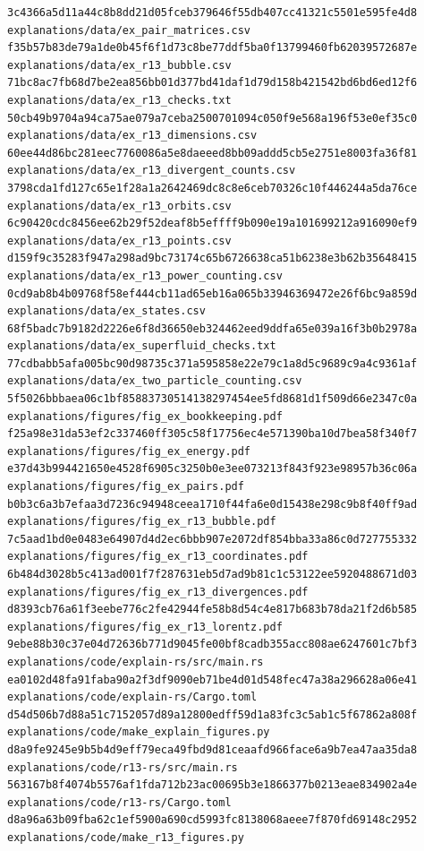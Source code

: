 \documentclass[
  10pt,
]{article}
\begin{document}
\begin{verbatim}
3c4366a5d11a44c8b8dd21d05fceb379646f55db407cc41321c5501e595fe4d8  explanations/data/ex_pair_matrices.csv
f35b57b83de79a1de0b45f6f1d73c8be77ddf5ba0f13799460fb62039572687e  explanations/data/ex_r13_bubble.csv
71bc8ac7fb68d7be2ea856bb01d377bd41daf1d79d158b421542bd6bd6ed12f6  explanations/data/ex_r13_checks.txt
50cb49b9704a94ca75ae079a7ceba2500701094c050f9e568a196f53e0ef35c0  explanations/data/ex_r13_dimensions.csv
60ee44d86bc281eec7760086a5e8daeeed8bb09addd5cb5e2751e8003fa36f81  explanations/data/ex_r13_divergent_counts.csv
3798cda1fd127c65e1f28a1a2642469dc8c8e6ceb70326c10f446244a5da76ce  explanations/data/ex_r13_orbits.csv
6c90420cdc8456ee62b29f52deaf8b5effff9b090e19a101699212a916090ef9  explanations/data/ex_r13_points.csv
d159f9c35283f947a298ad9bc73174c65b6726638ca51b6238e3b62b35648415  explanations/data/ex_r13_power_counting.csv
0cd9ab8b4b09768f58ef444cb11ad65eb16a065b33946369472e26f6bc9a859d  explanations/data/ex_states.csv
68f5badc7b9182d2226e6f8d36650eb324462eed9ddfa65e039a16f3b0b2978a  explanations/data/ex_superfluid_checks.txt
77cdbabb5afa005bc90d98735c371a595858e22e79c1a8d5c9689c9a4c9361af  explanations/data/ex_two_particle_counting.csv
5f5026bbbaea06c1bf85883730514138297454ee5fd8681d1f509d66e2347c0a  explanations/figures/fig_ex_bookkeeping.pdf
f25a98e31da53ef2c337460ff305c58f17756ec4e571390ba10d7bea58f340f7  explanations/figures/fig_ex_energy.pdf
e37d43b994421650e4528f6905c3250b0e3ee073213f843f923e98957b36c06a  explanations/figures/fig_ex_pairs.pdf
b0b3c6a3b7efaa3d7236c94948ceea1710f44fa6e0d15438e298c9b8f40ff9ad  explanations/figures/fig_ex_r13_bubble.pdf
7c5aad1bd0e0483e64907d4d2ec6bbb907e2072df854bba33a86c0d727755332  explanations/figures/fig_ex_r13_coordinates.pdf
6b484d3028b5c413ad001f7f287631eb5d7ad9b81c1c53122ee5920488671d03  explanations/figures/fig_ex_r13_divergences.pdf
d8393cb76a61f3eebe776c2fe42944fe58b8d54c4e817b683b78da21f2d6b585  explanations/figures/fig_ex_r13_lorentz.pdf
9ebe88b30c37e04d72636b771d9045fe00bf8cadb355acc808ae6247601c7bf3  explanations/code/explain-rs/src/main.rs
ea0102d48fa91faba90a2f3df9090eb71be4d01d548fec47a38a296628a06e41  explanations/code/explain-rs/Cargo.toml
d54d506b7d88a51c7152057d89a12800edff59d1a83fc3c5ab1c5f67862a808f  explanations/code/make_explain_figures.py
d8a9fe9245e9b5b4d9eff79eca49fbd9d81ceaafd966face6a9b7ea47aa35da8  explanations/code/r13-rs/src/main.rs
563167b8f4074b5576af1fda712b23ac00695b3e1866377b0213eae834902a4e  explanations/code/r13-rs/Cargo.toml
d8a96a63b09fba62c1ef5900a690cd5993fc8138068aeee7f870fd69148c2952  explanations/code/make_r13_figures.py
\end{verbatim}
\end{document}
